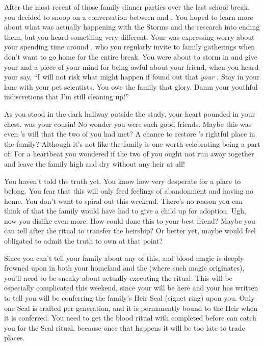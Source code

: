 \documentclass[char]{GL2020}
\begin{document}
After the most recent of those family dinner parties over the last school break, you decided to snoop on a conversation between \cDiplomat{} and \cFaledonParent{}. You hoped to learn more about what was actually happening with the Storms and the research into ending them, but you heard something very different. Your \cFaledonParent{\parent} was expressing worry about your \cDiplomat{\auncle} spending time around \cAmbition{}, who you regularly invite to family gatherings when \cAmbition{\they} don’t want to go home for the entire break. You were about to storm in and give your \cFaledonParent{\parent} and \cDiplomat{\auncle} a piece of your mind for being awful about your friend, when you heard your \cFaledonParent{\parent} say, “I will not risk what might happen if \cAmbition{} found out that \cAmbition{\theyare} \emph{your} \cAmbition{\offspring}. Stay in your lane with your pet scientists. You owe the family that glory. Damn your youthful indiscretions that I’m still cleaning up!” 

As you stood in the dark hallway outside the study, your heart pounded in your chest. \cAmbition{} was your cousin! No wonder you were such good friends. Maybe this was even \cTechGod{}’s will that the two of you had met? A chance to restore \cAmbition{}’s rightful place in the family? Although it’s not like the \cHeir{\formal} family is one worth celebrating being a part of.  For a heartbeat you wondered if the two of you ought not run away together and leave the \cHeir{\formal} family high and dry without any heir at all! 

You haven’t told \cAmbition{} the truth yet. You know how very desperate \cAmbition{\theyare} for a place to belong. You fear that this will only feed \cAmbition{\their} feelings of abandonment and having no home. You don’t want \cAmbition{} to spiral out this weekend. There’s no reason you can think of that the \cHeir{\formal} family would have had to give a child up for adoption. Ugh, now you dislike \cDiplomat{} even more. How could \cDiplomat{\they{} \have} done this to your best friend? Maybe you can tell \cAmbition{} after the ritual to transfer the heirship? Or better yet, maybe \cDiplomat{} would feel obligated to admit the truth to \cDiplomat{\their} own \cAmbition{\child} at that point?  

Since you can’t tell your family about any of this, and blood magic is deeply frowned upon in both your homeland and the \pFarm{} (where such magic originates), you'll need to be sneaky about actually executing the ritual. This will be especially complicated this weekend, since your \cDiplomat{\auncle} will be here and your \cFaledonParent{\parent} has written to tell you \cDiplomat{\they} will be conferring the family's Heir Seal (signet ring) upon you. Only one Seal is crafted per generation, and it is permanently bound to the Heir when it is conferred. You need to get the blood ritual with \cAmbition{} completed before \cDiplomat{} can catch you for the Seal ritual, because once that happens it will be too late to trade places. 
\end{document}
